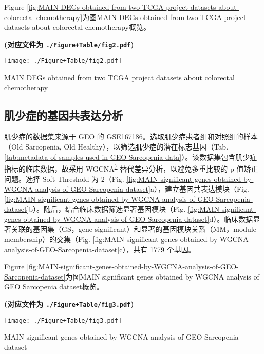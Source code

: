 \documentclass[
]{article}
\begin{document}
Figure \ref{fig:MAIN-DEGs-obtained-from-two-TCGA-project-datasets-about-colorectal-chemotherapy}为图MAIN DEGs obtained from two TCGA project datasets about colorectal chemotherapy概览。

\textbf{(对应文件为 \texttt{./Figure+Table/fig2.pdf})}

\def\@captype{figure}
\begin{center}
\texttt{[image: ./Figure+Table/fig2.pdf]}
\caption{MAIN DEGs obtained from two TCGA project datasets about colorectal chemotherapy}\label{fig:MAIN-DEGs-obtained-from-two-TCGA-project-datasets-about-colorectal-chemotherapy}
\end{center}

\hypertarget{SarSig}{%
\subsection{肌少症的基因共表达分析}\label{SarSig}}

肌少症的数据集来源于 GEO 的 GSE167186。选取肌少症患者组和对照组的样本（Old Sarcopenia, Old Healthy），以筛选肌少症的潜在标志基因（Tab. \ref{tab:metadata-of-samples-used-in-GEO-Sarcopenia-data}）。该数据集包含肌少症指标的临床数据，故采用 WGCNA\textsuperscript{\protect\hyperlink{ref-WgcnaAnRPacLangfe2008}{7}} 替代差异分析，以避免多重比较的 p 值矫正问题。选择 Soft Threshold 为 2（Fig. \ref{fig:MAIN-significant-genes-obtained-by-WGCNA-analysis-of-GEO-Sarcopenia-dataset}a），建立基因共表达模块（Fig. \ref{fig:MAIN-significant-genes-obtained-by-WGCNA-analysis-of-GEO-Sarcopenia-dataset}b）。随后，结合临床数据筛选显著基因模块（Fig. \ref{fig:MAIN-significant-genes-obtained-by-WGCNA-analysis-of-GEO-Sarcopenia-dataset}d）。临床数据显著关联的基因集（GS，gene significant）和显著的基因模块关系（MM，module membership）的交集（Fig. \ref{fig:MAIN-significant-genes-obtained-by-WGCNA-analysis-of-GEO-Sarcopenia-dataset}c），共有 1779 个基因。

Figure \ref{fig:MAIN-significant-genes-obtained-by-WGCNA-analysis-of-GEO-Sarcopenia-dataset}为图MAIN significant genes obtained by WGCNA analysis of GEO Sarcopenia dataset概览。

\textbf{(对应文件为 \texttt{./Figure+Table/fig3.pdf})}

\def\@captype{figure}
\begin{center}
\texttt{[image: ./Figure+Table/fig3.pdf]}
\caption{MAIN significant genes obtained by WGCNA analysis of GEO Sarcopenia dataset}\label{fig:MAIN-significant-genes-obtained-by-WGCNA-analysis-of-GEO-Sarcopenia-dataset}
\end{center}
\end{document}
